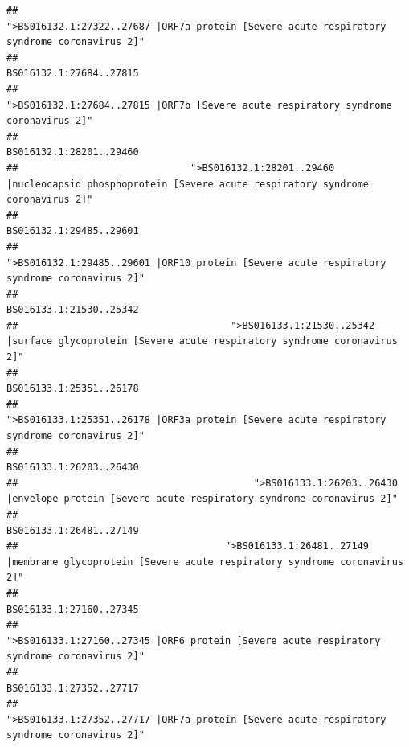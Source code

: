 \documentclass[
]{article}
\begin{document}
\begin{verbatim}
##                                            ">BS016132.1:27322..27687 |ORF7a protein [Severe acute respiratory syndrome coronavirus 2]" 
##                                                                                                                BS016132.1:27684..27815 
##                                                    ">BS016132.1:27684..27815 |ORF7b [Severe acute respiratory syndrome coronavirus 2]" 
##                                                                                                                BS016132.1:28201..29460 
##                              ">BS016132.1:28201..29460 |nucleocapsid phosphoprotein [Severe acute respiratory syndrome coronavirus 2]" 
##                                                                                                                BS016132.1:29485..29601 
##                                            ">BS016132.1:29485..29601 |ORF10 protein [Severe acute respiratory syndrome coronavirus 2]" 
##                                                                                                                BS016133.1:21530..25342 
##                                     ">BS016133.1:21530..25342 |surface glycoprotein [Severe acute respiratory syndrome coronavirus 2]" 
##                                                                                                                BS016133.1:25351..26178 
##                                            ">BS016133.1:25351..26178 |ORF3a protein [Severe acute respiratory syndrome coronavirus 2]" 
##                                                                                                                BS016133.1:26203..26430 
##                                         ">BS016133.1:26203..26430 |envelope protein [Severe acute respiratory syndrome coronavirus 2]" 
##                                                                                                                BS016133.1:26481..27149 
##                                    ">BS016133.1:26481..27149 |membrane glycoprotein [Severe acute respiratory syndrome coronavirus 2]" 
##                                                                                                                BS016133.1:27160..27345 
##                                             ">BS016133.1:27160..27345 |ORF6 protein [Severe acute respiratory syndrome coronavirus 2]" 
##                                                                                                                BS016133.1:27352..27717 
##                                            ">BS016133.1:27352..27717 |ORF7a protein [Severe acute respiratory syndrome coronavirus 2]" 

\end{verbatim}
\end{document}
